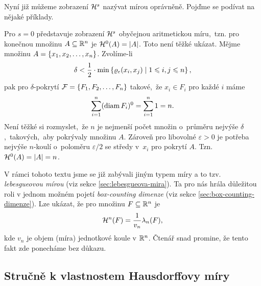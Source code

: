 Nyní již můžeme zobrazení $\mathcal{H}^{s}$ nazývat mírou oprávněně. Pojďme se podívat na nějaké příklady.
\begin{example}
    Pro $s=0$ představuje zobrazení $\mathcal{H}^{s}$ obyčejnou aritmetickou míru,~tzn. pro konečnou množinu $A\subseteq\mathbb{R}^n$ je $\mathcal{H}^{0}(A)=|A|$. Toto není těžké ukázat. Mějme množinu $A=\left\{x_1,x_2,\ldots,x_n\right\}$. Zvolíme-li
    \[\delta<\dfrac{1}{2}\cdot\min\left\{\varrho_e(x_i,x_j)\mid 1\leqslant i,j\leqslant n\right\},\]
    pak pro $\delta$-pokrytí $\mathcal{F}=\left\{F_1,F_2,\ldots,F_n\right\}$ takové,~že $x_i\in F_i$ pro každé $i$ máme
    \[\sum_{i=1}^{n}(\operatorname{diam}{F_i})^0=\sum_{i=1}^{n}1=n.\]
    Není těžké si rozmyslet,~že $n$ je nejmenší počet množin o~průměru nejvýše $\delta$,~takových,~aby pokrývaly množinu $A$. Zároveň pro libovolné $\varepsilon>0$ je potřeba nejvýše $n$-koulí o~poloměru $\varepsilon/2$ se středy v~$x_i$ pro pokrytí $A$. Tzn.~$\mathcal{H}^{0}(A)=|A|=n$.
\end{example}

V rámci tohoto textu jsme se již zabývali jiným typem míry a to tzv. \emph{lebesgueovou mírou} (viz sekce \ref{sec:lebesgueova-mira}). Ta pro nás hrála důležitou roli v jednom možném pojetí \emph{box-counting dimenze} (viz sekce \ref{sec:box-counting-dimenze}). Lze ukázat, že pro množinu $F\subseteq\mathbb{R}^n$ je
\[\mathcal{H}^{n}(F)=\dfrac{1}{v_n}\lambda_n(F),\]
kde $v_n$ je objem (míra) jednotkové koule v $\mathbb{R}^n$. Čtenář snad promine, že tento fakt zde ponecháme bez důkazu. \citep[str. 45]{Falconer2014}

\subsection{Stručně k vlastnostem Hausdorffovy míry}\label{subsec:vlastnosti-hausdorffovy-miry}

